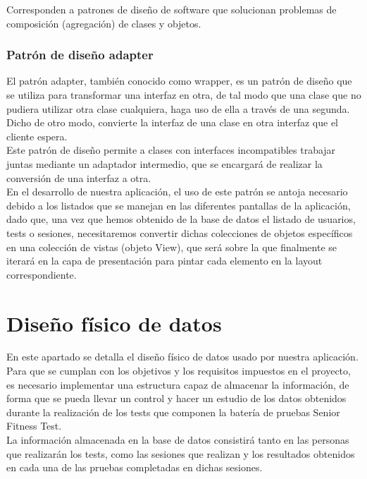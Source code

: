 Corresponden a patrones de diseño de software que solucionan problemas de composición (agregación) de clases y objetos.

\subsubsection{Patrón de diseño adapter}

El patrón adapter, también conocido como wrapper, es un patrón de diseño que se utiliza para transformar una interfaz en otra, de tal modo que una clase que no pudiera utilizar otra clase cualquiera, haga uso de ella a través de una segunda. Dicho de otro modo, convierte la interfaz de una clase en otra interfaz que el cliente espera.\\

Este patrón de diseño permite a clases con interfaces incompatibles trabajar juntas mediante un adaptador intermedio, que se encargará de realizar la conversión de una interfaz a otra.\\

En el desarrollo de nuestra aplicación, el uso de este patrón se antoja necesario debido a los listados que se manejan en las diferentes pantallas de la aplicación, dado que, una vez que hemos obtenido de la base de datos el listado de usuarios, tests o sesiones, necesitaremos convertir dichas colecciones de objetos específicos en una colección de vistas (objeto View), que será sobre la que finalmente se iterará en la capa de presentación para pintar cada elemento en la layout correspondiente.

\section{Diseño físico de datos}

En este apartado se detalla el diseño físico de datos usado por nuestra aplicación.\\

Para que se cumplan con los objetivos y los requisitos impuestos en el proyecto, es necesario implementar una estructura capaz de almacenar la información, de forma que se pueda llevar un control y hacer un estudio de los datos obtenidos durante la realización de los tests que componen la batería de pruebas Senior Fitness Test.\\

La información almacenada en la base de datos consistirá tanto en las personas que realizarán los tests, como las sesiones que realizan y los resultados obtenidos en cada una de las pruebas completadas en dichas sesiones.

